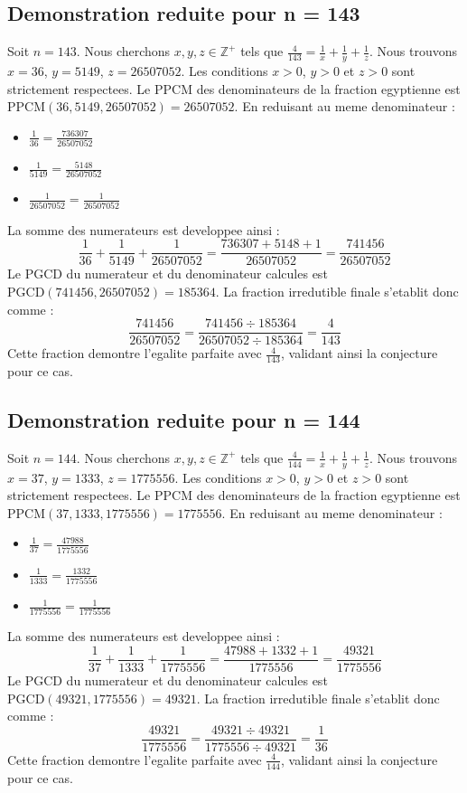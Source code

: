 \documentclass[11pt,a4paper]{article}
\begin{document}
\subsection{Demonstration reduite pour n = 143}
Soit $n = 143$. Nous cherchons $x, y, z \in \mathbb{Z}^{+}$ tels que $\frac{4}{143} = \frac{1}{x} + \frac{1}{y} + \frac{1}{z}$.
Nous trouvons $x = 36$, $y = 5149$, $z = 26507052$.
Les conditions $x > 0$, $y > 0$ et $z > 0$ sont strictement respectees.
Le PPCM des denominateurs de la fraction egyptienne est $\text{PPCM}(36, 5149, 26507052) = 26507052$.
En reduisant au meme denominateur :
\begin{itemize}
    \item $\frac{1}{36} = \frac{736307}{26507052}$
    \item $\frac{1}{5149} = \frac{5148}{26507052}$
    \item $\frac{1}{26507052} = \frac{1}{26507052}$
\end{itemize}
La somme des numerateurs est developpee ainsi :
$$ \frac{1}{36} + \frac{1}{5149} + \frac{1}{26507052} = \frac{736307 + 5148 + 1}{26507052} = \frac{741456}{26507052} $$
Le PGCD du numerateur et du denominateur calcules est $\text{PGCD}(741456, 26507052) = 185364$.
La fraction irredutible finale s'etablit donc comme :
$$ \frac{741456}{26507052} = \frac{741456 \div 185364}{26507052 \div 185364} = \frac{4}{143} $$
Cette fraction demontre l'egalite parfaite avec $\frac{4}{143}$, validant ainsi la conjecture pour ce cas.

\subsection{Demonstration reduite pour n = 144}
Soit $n = 144$. Nous cherchons $x, y, z \in \mathbb{Z}^{+}$ tels que $\frac{4}{144} = \frac{1}{x} + \frac{1}{y} + \frac{1}{z}$.
Nous trouvons $x = 37$, $y = 1333$, $z = 1775556$.
Les conditions $x > 0$, $y > 0$ et $z > 0$ sont strictement respectees.
Le PPCM des denominateurs de la fraction egyptienne est $\text{PPCM}(37, 1333, 1775556) = 1775556$.
En reduisant au meme denominateur :
\begin{itemize}
    \item $\frac{1}{37} = \frac{47988}{1775556}$
    \item $\frac{1}{1333} = \frac{1332}{1775556}$
    \item $\frac{1}{1775556} = \frac{1}{1775556}$
\end{itemize}
La somme des numerateurs est developpee ainsi :
$$ \frac{1}{37} + \frac{1}{1333} + \frac{1}{1775556} = \frac{47988 + 1332 + 1}{1775556} = \frac{49321}{1775556} $$
Le PGCD du numerateur et du denominateur calcules est $\text{PGCD}(49321, 1775556) = 49321$.
La fraction irredutible finale s'etablit donc comme :
$$ \frac{49321}{1775556} = \frac{49321 \div 49321}{1775556 \div 49321} = \frac{1}{36} $$
Cette fraction demontre l'egalite parfaite avec $\frac{4}{144}$, validant ainsi la conjecture pour ce cas.
\end{document}
